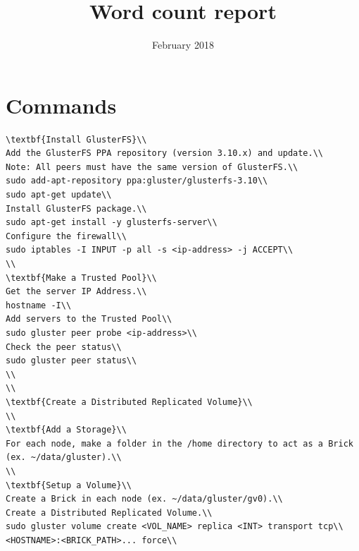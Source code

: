 \documentclass{article}
\title{Word count report}
\date{February 2018}
\begin{document}
\maketitle

\section{Commands}
\begin{lstlisting}
\textbf{Install GlusterFS}\\
Add the GlusterFS PPA repository (version 3.10.x) and update.\\
Note: All peers must have the same version of GlusterFS.\\
sudo add-apt-repository ppa:gluster/glusterfs-3.10\\
sudo apt-get update\\
Install GlusterFS package.\\
sudo apt-get install -y glusterfs-server\\
Configure the firewall\\
sudo iptables -I INPUT -p all -s <ip-address> -j ACCEPT\\
\\
\textbf{Make a Trusted Pool}\\
Get the server IP Address.\\
hostname -I\\
Add servers to the Trusted Pool\\
sudo gluster peer probe <ip-address>\\
Check the peer status\\
sudo gluster peer status\\
\\
\\
\textbf{Create a Distributed Replicated Volume}\\
\\
\textbf{Add a Storage}\\
For each node, make a folder in the /home directory to act as a Brick (ex. ~/data/gluster).\\
\\
\textbf{Setup a Volume}\\
Create a Brick in each node (ex. ~/data/gluster/gv0).\\
Create a Distributed Replicated Volume.\\
sudo gluster volume create <VOL_NAME> replica <INT> transport tcp\\ <HOSTNAME>:<BRICK_PATH>... force\\

\end{lstlisting}
\end{document}
